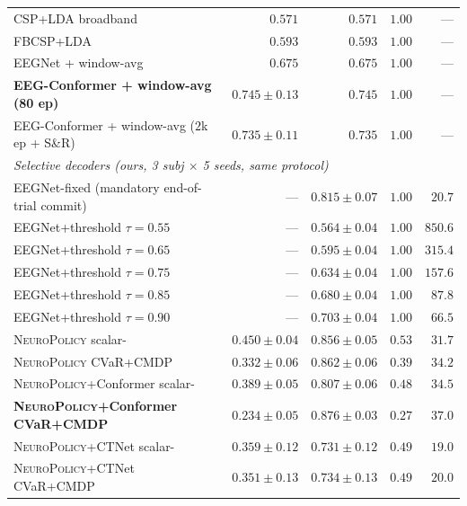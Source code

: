 \begin{table}[!htbp]
\begin{tabular}{l r r r r}
CSP+LDA broadband                                      & $0.571$ & $0.571$ & $1.00$ & --- \\
FBCSP+LDA                                              & $0.593$ & $0.593$ & $1.00$ & --- \\
EEGNet + window-avg                                    & $0.675$ & $0.675$ & $1.00$ & --- \\
\textbf{EEG-Conformer + window-avg (80 ep)}            & $\mathbf{0.745 \!\pm\! 0.13}$ & $\mathbf{0.745}$ & $1.00$ & --- \\
EEG-Conformer + window-avg ($2$k ep + S\&R)            & $0.735 \!\pm\! 0.11$ & $0.735$ & $1.00$ & --- \\
\midrule
\multicolumn{5}{l}{\textit{Selective decoders (ours, 3 subj $\times$ 5 seeds, same protocol)}} \\
EEGNet-fixed (mandatory end-of-trial commit)            & --- & $0.815 \!\pm\! 0.07$ & $1.00$ & $20.7$ \\
EEGNet+threshold $\tau=0.55$                            & --- & $0.564 \!\pm\! 0.04$ & $1.00$ & $850.6$ \\
EEGNet+threshold $\tau=0.65$                            & --- & $0.595 \!\pm\! 0.04$ & $1.00$ & $315.4$ \\
EEGNet+threshold $\tau=0.75$                            & --- & $0.634 \!\pm\! 0.04$ & $1.00$ & $157.6$ \\
EEGNet+threshold $\tau=0.85$                            & --- & $0.680 \!\pm\! 0.04$ & $1.00$ & $87.8$ \\
EEGNet+threshold $\tau=0.90$                            & --- & $0.703 \!\pm\! 0.04$ & $1.00$ & $66.5$ \\
\textsc{NeuroPolicy} scalar-\cql{}                      & $0.450 \!\pm\! 0.04$ & $0.856 \!\pm\! 0.05$ & $0.53$ & $31.7$ \\
\textsc{NeuroPolicy} CVaR+CMDP                  & $0.332 \!\pm\! 0.06$ & $0.862 \!\pm\! 0.06$ & $0.39$ & $34.2$ \\
\textsc{NeuroPolicy}+Conformer scalar-\cql{}    & $0.389 \!\pm\! 0.05$ & $0.807 \!\pm\! 0.06$ & $0.48$ & $34.5$ \\
\textbf{\textsc{NeuroPolicy}+Conformer CVaR+CMDP} & $0.234 \!\pm\! 0.05$ & $\mathbf{0.876 \!\pm\! 0.03}$ & $0.27$ & $\mathbf{37.0}$ \\
\textsc{NeuroPolicy}+CTNet scalar-\cql{}        & $0.359 \!\pm\! 0.12$ & $0.731 \!\pm\! 0.12$ & $0.49$ & $19.0$ \\
\textsc{NeuroPolicy}+CTNet CVaR+CMDP            & $0.351 \!\pm\! 0.13$ & $0.734 \!\pm\! 0.13$ & $0.49$ & $20.0$ \\

\end{tabular}
\end{table}
